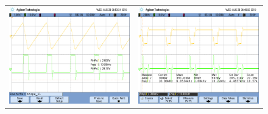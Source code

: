 \begin{figure}[H]
	\centering
	\begin{tabular}{c c}
		\includegraphics[scale=0.2]{../EJ4/Derivador/Mediciones/Osciloscopio/PCB_Sin_Compensar/scope_11.png} &
		\includegraphics[scale=0.2]{../EJ4/Derivador/Mediciones/Osciloscopio/PCB_Sin_Compensar/scope_3.png} \\

\end{tabular}
\end{figure}
